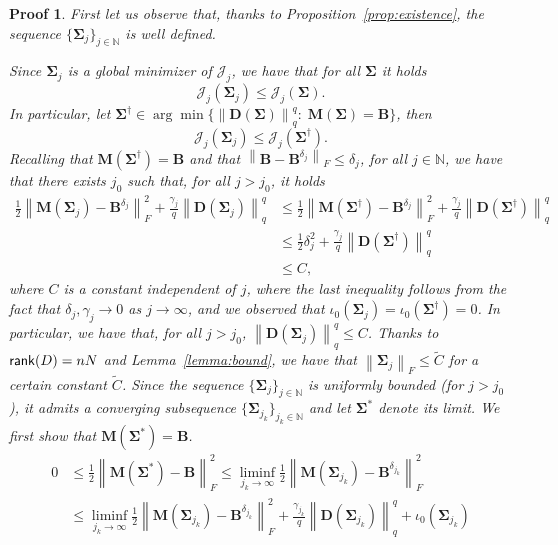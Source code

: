 \documentclass[final,leqno]{siamltex}
\newtheorem{prf}[theorem]{Proof}
\newcommand{\N}{{\mathbb N}}
\newcommand{\ts}[1]{\mbox{\textsf{#1}}}
\newcommand{\norm}[1]{\left\| #1 \right\|}
\newcommand{\Sigmab}{\mathbf{\Sigma}}
\begin{document}
\begin{prf}
	First let us observe that, thanks to Proposition~\ref{prop:existence}, the sequence $\{\Sigmab_j\}_{j\in\N}$ is well defined.
	
	Since $\Sigmab_j$ is a global minimizer of $\mathcal{J}_j$, we have that for all $\Sigmab$ it holds
	$$
	\mathcal{J}_j(\Sigmab_j)\leq\mathcal{J}_j(\Sigmab).
	$$
	In particular, let $\Sigmab^\dagger\in\arg\min\{\norm{\mathbf{D}(\Sigmab)}_q^q:\;\mathbf{M}(\Sigmab)=\mathbf{B}\}$, then
	$$
	\mathcal{J}_j(\Sigmab_j)\leq\mathcal{J}_j(\Sigmab^\dagger).
	$$
	Recalling that $\mathbf{M}(\Sigmab^\dagger)=\mathbf{B}$ and that $\norm{\mathbf{B}-\mathbf{B}^{\delta_j}}_F\leq\delta_j$, for all $j\in\N$, we have that there exists $j_0$ such that, for all $j>j_0$, it holds
	\begin{align*}
		\frac{1}{2}\norm{\mathbf{M}(\mathbf{\Sigma}_j)-\mathbf{B}^{\delta_j}}_F^2+\frac{\gamma_j}{q}\norm{\mathbf{D}(\mathbf{\Sigma}_j)}_q^q&\leq\frac{1}{2}\norm{\mathbf{M}(\mathbf{\Sigma}^\dagger)-\mathbf{B}^{\delta_j}}_F^2+\frac{\gamma_j}{q}\norm{\mathbf{D}(\mathbf{\Sigma}^\dagger)}_q^q\nonumber\\
		&\leq\frac{1}{2}\delta_j^2+\frac{\gamma_j}{q}\norm{\mathbf{D}(\mathbf{\Sigma}^\dagger)}_q^q\nonumber\\
		&\leq C,\nonumber
	\end{align*}
	where $C$ is a constant independent of $j$, where the last inequality follows from the fact that $\delta_j,\gamma_j\rightarrow0$ as $j\rightarrow\infty$, and we observed that $\iota_0(\Sigmab_j)=\iota_0(\Sigmab^\dagger)=0$. In particular, we have that, for all $j>j_0$, $\norm{\mathbf{D}(\mathbf{\Sigma}_j)}_q^q\leq C$. Thanks to $\ts{rank}({D})=nN$ and Lemma~\ref{lemma:bound}, we have that $\norm{\mathbf{\Sigma}_j}_F\leq \widetilde{C}$ for a certain constant $\widetilde{C}$. Since the sequence $\{\Sigmab_j\}_{j\in\N}$ is uniformly bounded (for $j>j_0$), it admits a converging subsequence $\{\Sigmab_{j_k}\}_{j_k\in\N}$ and let $\Sigmab^*$ denote its limit. We first show that $\mathbf{M}(\Sigmab^*)=\mathbf{B}$.
	\begin{align*}
	0&\leq\frac{1}{2}\norm{\mathbf{M}(\Sigmab^*)-\mathbf{B}}^2_F\leq\liminf_{j_k\rightarrow\infty}\frac{1}{2}\norm{\mathbf{M}(\Sigmab_{j_k})-\mathbf{B}^{\delta_{j_k}}}^2_F\nonumber\\
	&\leq\liminf_{j_k\rightarrow\infty}\frac{1}{2}\norm{\mathbf{M}(\Sigmab_{j_k})-\mathbf{B}^{\delta_{j_k}}}^2_F+\frac{\gamma_{j_k}}{q}\norm{\mathbf{D}(\mathbf{\Sigma}_{j_k})}_q^q+\iota_0(\Sigmab_{j_k})\nonumber\\

\end{align*}
\end{prf}
\end{document}
